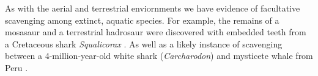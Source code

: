 \documentclass[a4paper,12pt]{article}
\begin{document}
As with the aerial and terrestrial enviornments we have evidence of facultative scavenging among extinct, aquatic species. For example, the remains of a mosasaur and a terrestrial hadrosaur were discovered with embedded teeth from a Cretaceous shark \textit{Squalicorax} \citep{schwimmer1997scavenging}. As well as a likely instance of scavenging between a 4-million-year-old white shark (\textit{Carcharodon}) and mysticete whale from Peru \citep{ehret2009caught}.








\end{document}

